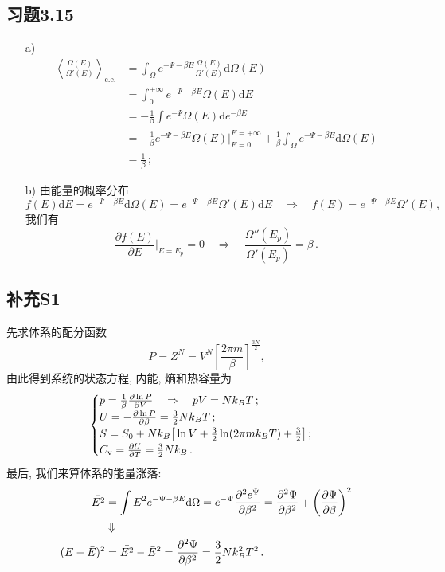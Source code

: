 \documentclass[letterpaper, 10pt]{article}
\newcommand{\dd}{\mathrm{d}}
\begin{document}
\subsection{习题3.15}
\begin{itemize}
	\item[a)]
	\begin{align*}
	\left\langle \frac{\Omega(E)}{\Omega'(E)} \right\rangle_{\text{c.e.}} & = \int_{\Omega} e^{-\Psi - \beta E} \frac{\Omega(E)}{\Omega'(E)} \dd \Omega(E) \\
	& = \int_{0}^{+\infty} e^{-\Psi -\beta E} \Omega(E) \dd E \\
	& = - \frac{1}{\beta} \int e^{-\Psi} \Omega(E) \dd e^{-\beta E} \\
	& = - \frac{1}{\beta} e^{-\Psi - \beta E} \Omega(E) \bigg|_{E=0}^{E=+\infty} + \frac{1}{\beta} \int_{\Omega} e^{-\Psi - \beta E} \dd \Omega(E) \\
	& = \frac{1}{\beta}\,;
	\end{align*}
	\item[b)]
	由能量的概率分布
	\[ f(E) \dd E = e^{-\Psi - \beta E} \dd \Omega(E) = e^{-\Psi - \beta E} \Omega'(E) \dd E \quad{} \Rightarrow \quad{} f(E) = e^{-\Psi - \beta E} \Omega'(E), \]
	我们有
	\[ \frac{\partial f(E)}{\partial E} \bigg|_{E=E_{p}} = 0 \quad{} \Rightarrow \quad{} \frac{\Omega''(E_{p})}{\Omega'(E_{p})} = \beta\,. \]
\end{itemize}

\subsection{补充S1}
先求体系的配分函数
\[ P = Z^{N} = V^{N} \left[ \frac{2\pi m}{\beta} \right]^{\frac{3N}{2}},  \]
由此得到系统的状态方程, 内能, 熵和热容量为
\[\begin{cases}
p = \frac{1}{\beta} \frac{\partial \ln P}{\partial V} \quad{} \Rightarrow \quad{} pV = Nk_{B}T\,;\\
U = - \frac{\partial \ln P}{\partial \beta} = \frac{3}{2}Nk_{B}T\,;\\
S = S_{0} + Nk_{B} \big[ \ln V + \frac{3}{2} \ln (2\pi m k_{B} T) + \frac{3}{2} \big]\,;\\
C_{\rm v} = \frac{\partial U}{\partial T} = \frac{3}{2} Nk_B\,.
\end{cases}\]
最后, 我们来算体系的能量涨落: 
\begin{align*}
\bar{E^2} & = \int E^{2} e^{-\Psi-\beta E} {\rm d}\Omega = e^{-\Psi} \frac{\partial^{2} e^{\Psi}}{\partial \beta^{2}} = 
\frac{\partial^{2} \Psi}{\partial \beta^{2}} + \left( \frac{\partial \Psi}{\partial \beta} \right)^{2}\,\\
& \Downarrow \, \\
(E-\bar{E})^{2} & = \bar{E^{2}} - \bar{E}^{2} = \frac{\partial^{2} \Psi}{\partial \beta^{2}} = \frac{3}{2} N k_{B}^{2} T^{2}\,.
\end{align*}
\end{document}
